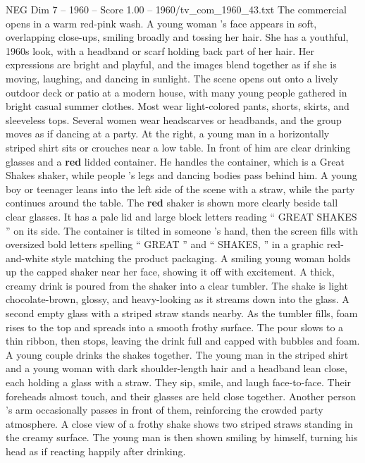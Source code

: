 \begin{textsample}{NEG Dim 7 – 1960 – Score 1.00 – 1960/tv\_com\_1960\_43.txt}  \label{ex:f7_neg_079}
The commercial opens in a warm red-pink wash.
A young woman ’s face appears in soft, overlapping close-ups, smiling broadly and tossing her hair.
She has a youthful, 1960s look, with a headband or scarf holding back part of her hair.
Her expressions are bright and playful, and the images blend together as if she is moving, laughing, and dancing in sunlight.
The scene opens out onto a lively outdoor deck or patio at a modern house, with many young people gathered in bright casual summer clothes.
Most wear light-colored pants, shorts, skirts, and sleeveless tops.
Several women wear headscarves or headbands, and the group moves as if dancing at a party.
At the right, a young man in a horizontally striped shirt sits or crouches near a low table.
In front of him are clear drinking glasses and a \textbf{red} lidded container.
He handles the container, which is a Great Shakes shaker, while people ’s legs and dancing bodies pass behind him.
A young boy or teenager leans into the left side of the scene with a straw, while the party continues around the table.
The \textbf{red} shaker is shown more clearly beside tall clear glasses.
It has a pale lid and large block letters reading “ GREAT SHAKES ” on its side.
The container is tilted in someone ’s hand, then the screen fills with oversized bold letters spelling “ GREAT ” and “ SHAKES, ” in a graphic red-and-white style matching the product packaging.
A smiling young woman holds up the capped shaker near her face, showing it off with excitement.
A thick, creamy drink is poured from the shaker into a clear tumbler.
The shake is light chocolate-brown, glossy, and heavy-looking as it streams down into the glass.
A second empty glass with a striped straw stands nearby.
As the tumbler fills, foam rises to the top and spreads into a smooth frothy surface.
The pour slows to a thin ribbon, then stops, leaving the drink full and capped with bubbles and foam.
A young couple drinks the shakes together.
The young man in the striped shirt and a young woman with dark shoulder-length hair and a headband lean close, each holding a glass with a straw.
They sip, smile, and laugh face-to-face.
Their foreheads almost touch, and their glasses are held close together.
Another person ’s arm occasionally passes in front of them, reinforcing the crowded party atmosphere.
A close view of a frothy shake shows two striped straws standing in the creamy surface.
The young man is then shown smiling by himself, turning his head as if reacting happily after drinking.

\end{textsample}
